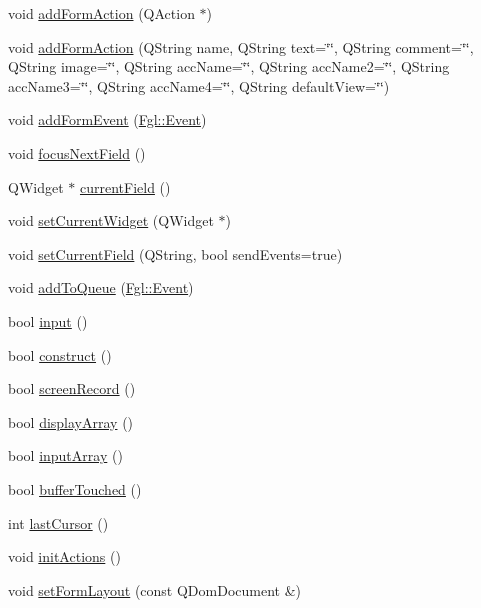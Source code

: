 \begin{DoxyCompactItemize}
\item 
void \hyperlink{classFglForm_ac43c7da12a298a241c7c98cf9a688a6f}{addFormAction} (QAction $\ast$)
\item 
void \hyperlink{classFglForm_a21e61578024f5922c949b4c2870684d4}{addFormAction} (QString name, QString text=\char`\"{}\char`\"{}, QString comment=\char`\"{}\char`\"{}, QString image=\char`\"{}\char`\"{}, QString accName=\char`\"{}\char`\"{}, QString accName2=\char`\"{}\char`\"{}, QString accName3=\char`\"{}\char`\"{}, QString accName4=\char`\"{}\char`\"{}, QString defaultView=\char`\"{}\char`\"{})
\item 
void \hyperlink{classFglForm_abadbd33d56f9bc46b3421f8fe0628952}{addFormEvent} (\hyperlink{structFgl_1_1Event}{Fgl::Event})
\item 
void \hyperlink{classFglForm_a5f3fea57cf46e7d548912efdaffa35f9}{focusNextField} ()
\item 
QWidget $\ast$ \hyperlink{classFglForm_a74cb6310512352e1fd501efbcd88724b}{currentField} ()
\item 
void \hyperlink{classFglForm_ac521356370affcf115340e2279475c6b}{setCurrentWidget} (QWidget $\ast$)
\item 
void \hyperlink{classFglForm_a4574756e714c6d93e6d177ecbfb78ae1}{setCurrentField} (QString, bool sendEvents=true)
\item 
void \hyperlink{classFglForm_a82a066a47d5d8bc2f7c2ec41ab29d4f2}{addToQueue} (\hyperlink{structFgl_1_1Event}{Fgl::Event})
\item 
bool \hyperlink{classFglForm_ab6b474ce22c93c45ccbee4b637647732}{input} ()
\item 
bool \hyperlink{classFglForm_ab131183405b70a2d48643ec9a522f877}{construct} ()
\item 
bool \hyperlink{classFglForm_a2e45f9d338ef208ffb1c08f1f97e6b2b}{screenRecord} ()
\item 
bool \hyperlink{classFglForm_a77b1a70cf1fff7d103b8c1895b3302c4}{displayArray} ()
\item 
bool \hyperlink{classFglForm_a452b19a215f6acbb86320ed3a8b32ead}{inputArray} ()
\item 
bool \hyperlink{classFglForm_ae6cab599f897bf58335df99e6d43b72d}{bufferTouched} ()
\item 
int \hyperlink{classFglForm_aab860a48ab46e95732543f3cb345ba26}{lastCursor} ()
\item 
void \hyperlink{classFglForm_af5e8206054e3275e2977056e685b73da}{initActions} ()
\item 
void \hyperlink{classFglForm_a6a923c50e859e58d34046d0b0f86c11d}{setFormLayout} (const QDomDocument \&)

\end{DoxyCompactItemize}
